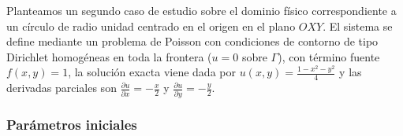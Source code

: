\documentclass[11pt]{book}
\theoremstyle{plain} %
\theoremstyle{definition} %
\theoremstyle{definition} %
\begin{document}
\vspace{-0.2cm}
Planteamos un segundo caso de estudio sobre el dominio físico correspondiente a un círculo de radio unidad centrado en el origen en el plano $OXY$.
El sistema se define mediante un problema de Poisson con condiciones de contorno de tipo Dirichlet homogéneas en toda la frontera ($u=0$ sobre $\Gamma$),
con término fuente $f(x,y) = 1$, la solución exacta viene dada por $u(x,y) = \frac{1-x^2-y^2}{4}$ y las derivadas parciales son
$\frac{\partial u}{\partial x} = -\frac{x}{2}$ y $\frac{\partial u}{\partial y} = -\frac{y}{2}$.

\vspace{-0.2cm}
\subsubsection{Parámetros iniciales}
\vspace{-0.2cm}
\end{document}
